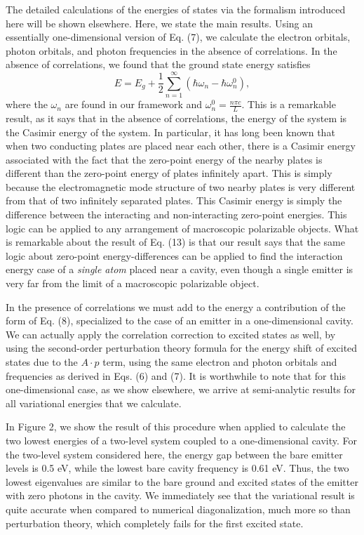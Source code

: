 \documentclass[aps,prl,twocolumn,
	groupedaddress,superscriptaddress,
	amsfonts,amssymb,amsmath,floatfix,
	citeautoscript]{revtex4-1}
\begin{document}
The detailed calculations of the energies of states via the formalism introduced here will be shown elsewhere. Here, we state the main results. Using an essentially one-dimensional version of Eq. (7), we calculate the electron orbitals, photon orbitals, and photon frequencies in the absence of correlations. In the absence of correlations, we found that the ground state energy satisfies
\begin{equation}
E = E_g + \frac{1}{2}\sum\limits_{n=1}^{\infty}(\hbar\omega_n - \hbar\omega_n^0),
\end{equation}
where the $\omega_n$ are found in our framework and $\omega_n^0 = \frac{n\pi c}{L}$. This is a remarkable result, as it says that in the absence of correlations, the energy of the system is the Casimir energy of the system. In particular, it has long been known that when two conducting plates are placed near each other, there is a Casimir energy associated with the fact that the zero-point energy of the nearby plates is different than the zero-point energy of plates infinitely apart. This is simply because the electromagnetic mode structure of two nearby plates is very different from that of two infinitely separated plates. This Casimir energy is simply the difference between the interacting and non-interacting zero-point energies. This logic can be applied to any arrangement of macroscopic polarizable objects. What is remarkable about the result of Eq. (13) is that our result says that the same logic about zero-point energy-differences can be applied to find the interaction energy case of a \textit{single atom} placed near a cavity, even though a single emitter is very far from the limit of a macroscopic polarizable object. 

In the presence of correlations  we must add to the energy a contribution of the form of Eq. (8), specialized to the case of an emitter in a one-dimensional cavity. We can actually apply the correlation correction to excited states as well, by using the second-order perturbation theory formula for the energy shift of excited states due to the $A \cdot p$ term, using the same electron and photon orbitals and frequencies as derived in Eqs. (6) and (7). It is worthwhile to note that for this one-dimensional case, as we show elsewhere, we arrive at semi-analytic results for all variational energies that we calculate.

In Figure 2, we show the result of this procedure when applied to calculate the two lowest energies of a two-level system coupled to a one-dimensional cavity. For the two-level system considered here, the energy gap between the bare emitter levels is 0.5 eV, while the lowest bare cavity frequency is 0.61 eV. Thus, the two lowest eigenvalues are similar to the bare ground and excited states of the emitter with zero photons in the cavity.  We immediately see that the variational result is quite accurate when compared to numerical diagonalization, much more so than perturbation theory, which completely fails for the first excited state. 
\end{document}

